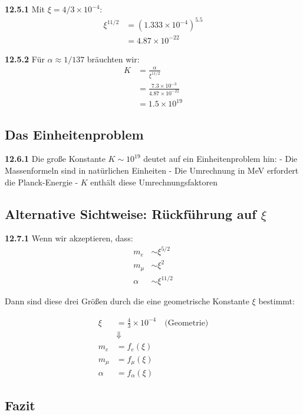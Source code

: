 \noindent \textbf{12.5.1} Mit $\xi = 4/3 \times 10^{-4}$:
\begin{align}
	\xi^{11/2} &= (1.333 \times 10^{-4})^{5.5} \\
	&= 4.87 \times 10^{-22}
\end{align}

\noindent \textbf{12.5.2} Für $\alpha \approx 1/137$ bräuchten wir:
\begin{align}
	K &= \frac{\alpha}{\xi^{11/2}} \\
	&= \frac{7.3 \times 10^{-3}}{4.87 \times 10^{-22}} \\
	&= 1.5 \times 10^{19}
\end{align}

\subsection{Das Einheitenproblem}

\noindent \textbf{12.6.1} Die große Konstante $K \sim 10^{19}$ deutet auf ein Einheitenproblem hin:
- Die Massenformeln sind in natürlichen Einheiten
- Die Umrechnung in MeV erfordert die Planck-Energie
- $K$ enthält diese Umrechnungsfaktoren

\subsection{Alternative Sichtweise: Rückführung auf $\xi$}

\noindent \textbf{12.7.1} Wenn wir akzeptieren, dass:
\begin{align}
	m_e &\sim \xi^{5/2} \\
	m_\mu &\sim \xi^2 \\
	\alpha &\sim \xi^{11/2}
\end{align}

Dann sind diese drei Größen durch die eine geometrische Konstante $\xi$ bestimmt:

\begin{equation}
	\boxed{
		\begin{aligned}
			\xi &= \frac{4}{3} \times 10^{-4} \quad \text{(Geometrie)} \\
			&\Downarrow \\
			m_e &= f_e(\xi) \\
			m_\mu &= f_\mu(\xi) \\
			\alpha &= f_\alpha(\xi)
		\end{aligned}
	}
\end{equation}

\subsection{Fazit}

